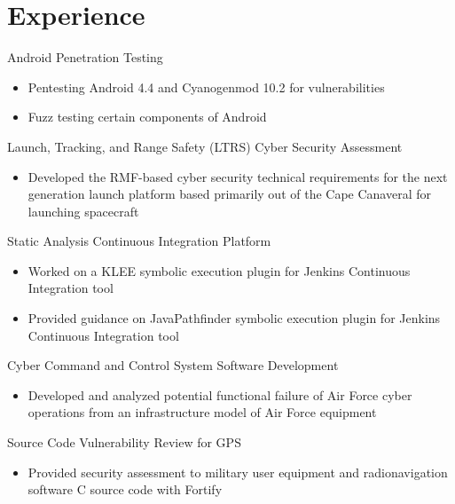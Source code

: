 \documentclass[letterpaper]{clinton-resume}
\begin{document}
\begin{minipage}[t]{0.66\textwidth}
\section{Experience}


\vspace{\topsep} 
\begin{tightitemize}
	\item Android Penetration Testing
	\begin{itemize}
		\item Pentesting Android 4.4 and Cyanogenmod 10.2 for vulnerabilities
		\item Fuzz testing certain components of Android
	\end{itemize}
	\item Launch, Tracking, and Range Safety (LTRS) Cyber Security Assessment
	\begin{itemize}
		\item Developed the RMF-based cyber security technical requirements for the next generation launch platform based primarily out of the Cape Canaveral for launching spacecraft
	\end{itemize}
	\item Static Analysis Continuous Integration Platform
	\begin{itemize}
		\item Worked on a KLEE symbolic execution plugin for Jenkins Continuous Integration tool
		\item Provided guidance on JavaPathfinder symbolic execution plugin for Jenkins Continuous Integration tool
	\end{itemize}
	\item Cyber Command and Control System Software Development
	\begin{itemize}
		\item  Developed and analyzed potential functional failure of Air Force cyber operations from an infrastructure model of Air Force equipment
	\end{itemize}
	\item Source Code Vulnerability Review for GPS
	\begin{itemize}
		\item Provided security assessment to military user equipment and radionavigation software C source code with Fortify

\end{itemize}
\end{tightitemize}
\end{minipage}
\end{document}
